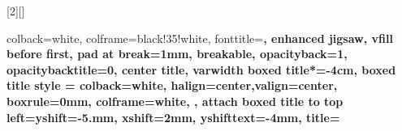 [2][]{
    colback=white,
    colframe=black!35!white,
    fonttitle=\bfseries,
    enhanced jigsaw,
    vfill before first, 
    pad at break=1mm,
    breakable,
    opacityback=1,
    opacitybacktitle=0,
    center title,
    varwidth boxed title*=-4cm,
    boxed title style = {%
    colback=white,
    halign=center,valign=center,
     boxrule=0mm,
     colframe=white,
    },
    attach boxed title to top left={yshift=-5.mm, xshift=2mm, yshifttext=-4mm},
    title={
      
      } }


    \newcommand{\makepage}{
      \pagestyle{empty}
      \section{\href{\link}{\music}}
      \ifempty{\autor} 
      \else 
        \subsection{
          \autor 
        } 
      \fi
      
      
      \hfill
      \begin{minipage}{5cm}
          \begin{center}
            {\small
              \color{gray}
              Tom: \tom \\
              Andamento: \bpm\, \compasso}
          \end{center}
      \end{minipage}
      
      \vspace{.3cm}
    }

